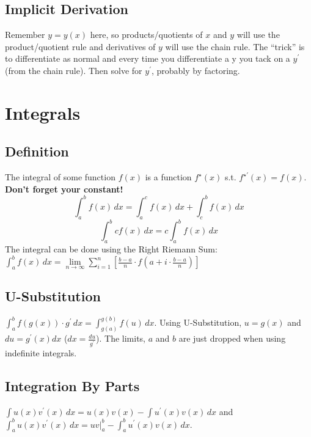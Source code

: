\documentclass[10pt,landscape,letterpaper]{cheatsheet}
\begin{document}
\subsection*{Implicit Derivation}
Remember $y = y(x)$ here, so products/quotients of $x$ and $y$ will use
the product/quotient rule and derivatives of $y$ will use the chain rule. The “trick” is to differentiate as normal
and every time you differentiate a y you tack on a $y^{\prime}$ (from the chain rule). Then solve for $y^{\prime}$, probably by factoring.

\section*{Integrals}

\subsection*{Definition}
The integral of some function $f(x)$ is a function $f^{\star}(x)$ s.t. $f^{\star\prime}(x)=f(x)$. \textbf{Don't forget your constant!}
$$ \int_{a}^{b} f(x) \,dx = \int_{a}^{c} f(x) \,dx + \int_{c}^{b} f(x) \,dx $$
$$ \int_{a}^{b} cf(x) \,dx = c\int_{a}^{b} f(x) \,dx $$
The integral can be done using the Right Riemann Sum:
$\int_{a}^{b} f(x) \,dx = \lim\limits_{n\to \infty}\sum_{i=1}^{n}\left[\frac{b-a}{n}\cdot f(a+i\cdot\frac{b-a}{n})\right]$

\subsection*{U-Substitution}
$ \displaystyle \int_{a}^{b} f(g(x)) \cdot g^{\prime} \,dx = \int_{g(a)}^{g(b)} f(u) \,dx $. Using U-Substitution, $u=g(x)$ and $du=g^{\prime}(x)dx$ ($dx=\frac{du}{g^{\prime}}$). The limits, $a$ and $b$ are just dropped when using indefinite integrals.

\subsection*{Integration By Parts}
$ \displaystyle \int u(x)v^{\prime}(x) \,dx = u(x)v(x) - \int u^{\prime}(x)v(x) \,dx $ and $ \displaystyle \int_{a}^{b} u(x)v^{\prime}(x) \,dx = uv\vert_{a}^{b} - \int_{a}^{b} u^{\prime}(x)v(x) \,dx$.
\end{document}
